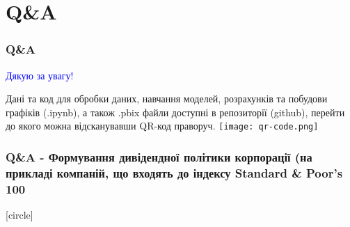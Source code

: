 \documentclass[aspectratio=169]{beamer}
\begin{document}
\section{Q\&A}

\begin{frame}
\frametitle{Q\&A}
\begin{center}
\bigskip
\textcolor{blue}{\huge Дякую за увагу!} \\
\end{center}
\begin{multicols}{2}

\vbox{\vspace{0.8cm}}
Дані та код для обробки даних, навчання моделей, розрахунків та побудови графіків (.ipynb), а також .pbix файли доступні в репозиторії (github), перейти до якого можна {відсканувавши QR-код праворуч.}
\columnbreak
\hspace{5mm}
\texttt{[image: qr-code.png]}
\end{multicols}
\end{frame}

\begin{frame}
\frametitle {Q\&A - Формування дивідендної політики корпорації (на прикладі компаній, що входять до індексу Standard \& Poor's 100 }
[circle]
\tableofcontents
\end{frame}
\end{document}
